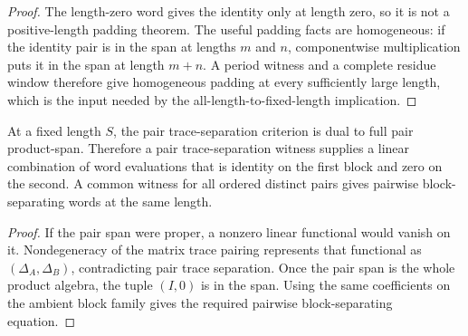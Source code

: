 \begin{proof}
    \leanok
    The length-zero word gives the identity only at length zero, so it is not a
    positive-length padding theorem. The useful padding facts are homogeneous:
    if the identity pair is in the span at lengths $m$ and $n$, componentwise
    multiplication puts it in the span at length $m+n$. A period witness and a
    complete residue window therefore give homogeneous padding at every
    sufficiently large length, which is the input needed by the
    all-length-to-fixed-length implication.
\end{proof}

\begin{lemma}
    \label{lem:pair_trace_separation_to_pairwise_block_separation}
    \leanok
    At a fixed length $S$, the pair trace-separation criterion is dual to full
    pair product-span. Therefore a pair trace-separation witness supplies a
    linear combination of word evaluations that is identity on the first block
    and zero on the second.
    A common witness for all ordered distinct pairs gives pairwise
    block-separating words at the same length.
\end{lemma}

\begin{proof}
    \leanok
    If the pair span were proper, a nonzero linear functional would vanish on
    it. Nondegeneracy of the matrix trace pairing represents that functional
    as $(\Delta_A,\Delta_B)$, contradicting pair trace separation. Once the
    pair span is the whole product algebra, the tuple $(I,0)$ is in the span.
    Using the same coefficients on the ambient block family gives the required
    pairwise block-separating equation.
\end{proof}

